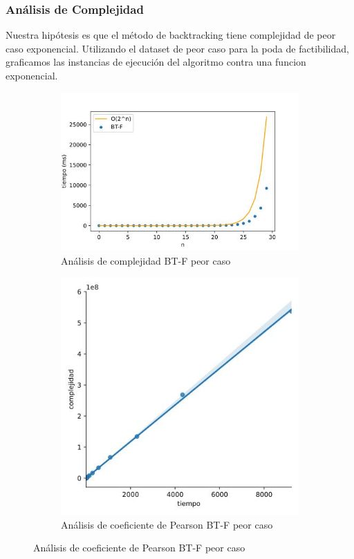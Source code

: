\documentclass[10pt,a4paper]{article}
\begin{document}
\subsubsection{Análisis de Complejidad}
Nuestra hipótesis es que el método de backtracking tiene complejidad de peor caso exponencial. Utilizando el dataset de peor caso para la poda de factibilidad, graficamos las instancias de ejecución del algoritmo contra una funcion exponencial.
\newline
\begin{figure}[h!]
\begin{subfigure}{0.4\linewidth}
	\centering
		\includegraphics[scale=0.30]{img/bt-complejidad-peor-caso.jpg}
		\caption{Análisis de complejidad BT-F peor caso}
		\label{fig:bt-complejidad-pero-caso}
\end{subfigure}
\begin{subfigure}{0.4\linewidth}
	\centering
		\includegraphics[scale=0.30]{img/bt-correlacion-peor-caso.jpg}
		\caption{Análisis de coeficiente de Pearson BT-F peor caso}
		\label{fig:bt-correlacion-peor-caso}
\end{subfigure}
\end{figure}
\end{document}
